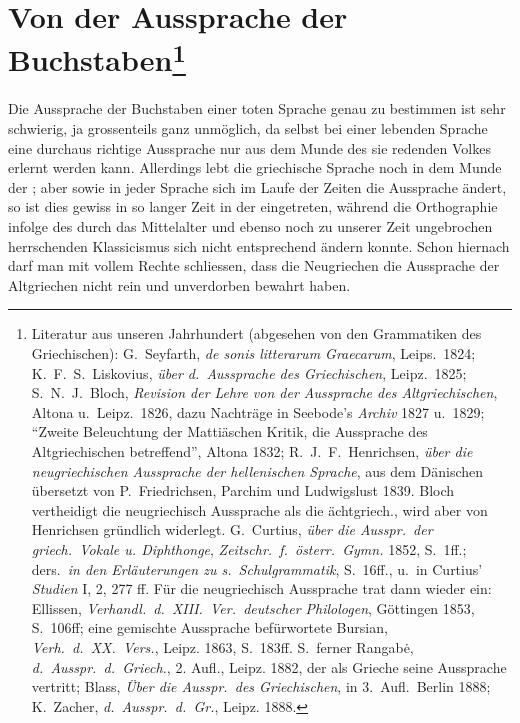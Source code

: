 \section[Von der Aussprache der Buchstaben]{Von der Aussprache der
  Buchstaben\protect\footnote{%
	  Literatur aus unseren Jahrhundert (abgesehen von den
	  Grammatiken des Griechischen): G.~Seyfarth, \emph{de sonis litterarum Graecarum},
	  Leips.\ 1824; K.~F.~S.~Liskovius, \emph{über d.\ Aussprache des Griechischen}, Leipz.\
	  1825; S.~N.~J.~Bloch, \emph{Revision der Lehre von der Aussprache des Altgriechischen},
	  Altona u.\ Leipz.\ 1826, dazu Nachträge in Seebode's \emph{Archiv} 1827 u.\ 1829;
	  ``Zweite Beleuchtung der Mattiäschen Kritik, die Aussprache des Altgriechischen
	  betreffend'', Altona 1832; R.~J.~F.~Henrichsen, \emph{über die neugriechischen
		  Aussprache der hellenischen Sprache}, aus dem Dänischen übersetzt von
	  P.~Friedrichsen, Parchim und Ludwigslust 1839.
	  Bloch vertheidigt die neugriechisch Aussprache als die ächtgriech., wird
	  aber von Henrichsen gründlich widerlegt.
	  G.~Curtius, \emph{über die Ausspr.\ der griech.~Vokale u. Diphthonge},
	  \emph{Zeitschr.~f.~österr.~Gymn.} 1852, S.\ 1ff.; ders.\ \emph{in den
		  Erläuterungen zu s.\ Schulgrammatik}, S.\ 16ff., u.\ in Curtius' \emph{Studien} I, 2, 277 ff.
	  Für die neugriechisch Aussprache trat dann wieder ein: Ellissen,
	  \emph{Verhandl.\ d.\ XIII.\ Ver.\ deutscher Philologen}, Göttingen 1853, S.\ 106ff; eine
	  gemischte Aussprache befürwortete Bursian, \emph{Verh.\ d.\ XX.\ Vers.}, Leipz. 1863,
	  S.\ 183ff. S.\ ferner Rangabė, \emph{d.\ Ausspr.\ d.\ Griech.}, 2. Aufl., Leipz. 1882,
	  der als Grieche seine Aussprache vertritt; Blass, \emph{Über die Ausspr.\ des
		  Griechischen}, in 3.\ Aufl.\ Berlin 1888; K.~Zacher, \emph{d.\ Ausspr.\ d.\ Gr.}, Leipz.
	  1888.
  }}\label{sec:buchstabenausprache}

\paragraph{} Die Aussprache der Buchstaben einer toten Sprache genau zu bestimmen ist sehr
schwierig, ja grossenteils ganz unmöglich, da selbst bei einer lebenden Sprache
eine durchaus richtige Aussprache nur aus dem Munde des sie redenden Volkes
erlernt werden kann. Allerdings lebt die griechische Sprache noch in dem Munde
der \Langlongdecl{neugrc}{en}; aber sowie in jeder Sprache sich im Laufe der Zeiten die
Aussprache ändert, so ist dies gewiss in so langer Zeit in der \langlongdecl{grc}{en}
eingetreten, während die Orthographie infolge des durch das Mittelalter und
ebenso noch zu unserer Zeit ungebrochen herrschenden Klassicismus sich nicht
entsprechend ändern konnte. Schon hiernach darf man mit vollem Rechte
schliessen, dass die Neugriechen die Aussprache der Altgriechen nicht rein und
unverdorben bewahrt haben.

